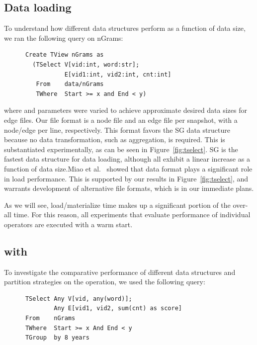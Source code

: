\subsection{Data loading}

To understand how different data structures perform as a function of
data size, we ran the following query on nGrams:

\begin{small}
\begin{verbatim}
      Create TView nGrams as 
        (TSelect V[vid:int, word:str]; 
                 E[vid1:int, vid2:int, cnt:int]
         From    data/nGrams
         TWhere  Start >= x and End < y)
\end{verbatim}
\end{small}

\noindent where  and  parameters were varied to
achieve approximate desired data sizes for edge files.  Our file
format is a node file and an edge file per snapshot, with a node/edge
per line, respectively.  This format favors the SG data structure
because no data transformation, such as aggregation, is required.
This is substantiated experimentally, as can be seen in
Figure~\ref{fig:tselect}.  SG is the fastest data structure for data
loading, although all exhibit a linear increase as a function of data
size.Miao et al.~\cite{DBLP:journals/tos/MiaoHLWYZPCC15} showed that
data format plays a significant role in load performance.  This is
supported by our results in Figure~\ref{fig:tselect}, and warrants
development of alternative file formats, which is in our immediate
plans.

As we will see, load/materialize time makes up a significant portion
of the over-all time.  For this reason, all experiments that evaluate
performance of individual \ql operators are executed with a warm
start.

\subsection{ with }
\label{sec:exp:tgroup}

To investigate the comparative performance of different data
structures and partition strategies on the  operation, we used
the following query:

\begin{small}
\begin{verbatim}
      TSelect Any V[vid, any(word)];
              Any E[vid1, vid2, sum(cnt) as score]
      From    nGrams
      TWhere  Start >= x And End < y
      TGroup  by 8 years
\end{verbatim}
\end{small}


